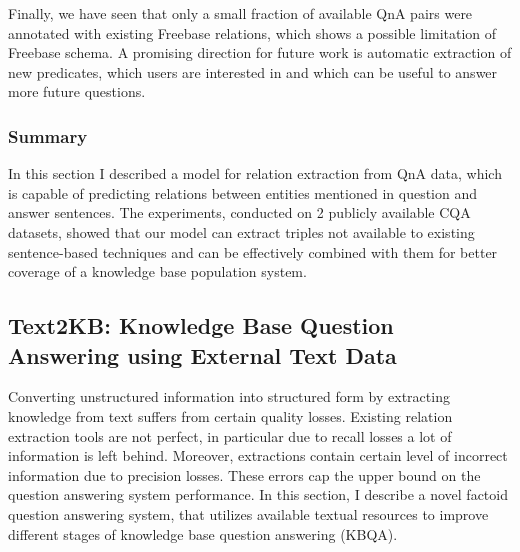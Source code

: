Finally, we have seen that only a small fraction of available QnA pairs were annotated with existing Freebase relations, which shows a possible limitation of Freebase schema.
A promising direction for future work is automatic extraction of new predicates, which users are interested in and which can be useful to answer more future questions.

\subsubsection{Summary}
\label{section:factoid:approaches:cqarelextract:summary}

In this section I described a model for relation extraction from QnA data, which is capable of predicting relations between entities mentioned in question and answer sentences.
The experiments, conducted on 2 publicly available CQA datasets, showed that our model can extract triples not available to existing sentence-based techniques and can be effectively combined with them for better coverage of a knowledge base population system.



\subsection{Text2KB: Knowledge Base Question Answering using External Text Data}
\label{section:factoid:approaches:text2kb}

Converting unstructured information into structured form by extracting knowledge from text suffers from certain quality losses.
Existing relation extraction tools are not perfect, in particular due to recall losses a lot of information is left behind.
Moreover, extractions contain certain level of incorrect information due to precision losses.
These errors cap the upper bound on the question answering system performance.
In this section, I describe a novel factoid question answering system, that utilizes available textual resources to improve different stages of knowledge base question answering (KBQA).

